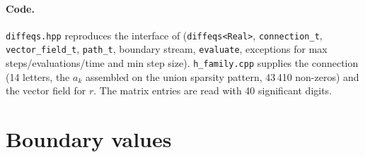 \documentclass[11pt,a4paper]{article}
\begin{document}
\paragraph{Code.}
\texttt{diffeqs.hpp} reproduces the interface of \cite{CT} (\texttt{diffeqs<Real>}, \texttt{connection\_t},
\texttt{vector\_field\_t}, \texttt{path\_t}, boundary stream, \texttt{evaluate}, exceptions for max steps/evaluations/time and
min step size).  \texttt{h\_family.cpp} supplies the connection (14 letters, the $a_k$ assembled on the union sparsity pattern,
43\,410 non-zeros) and the vector field for $r$.  The matrix entries are read with 40 significant digits.

\section{Boundary values}
\end{document}
